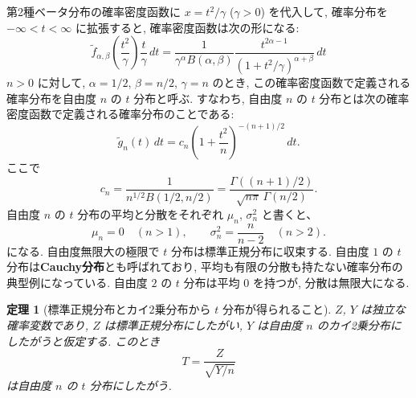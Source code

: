 \documentclass[12pt,twoside]{jarticle}
\newcommand\tf{{\tilde f}}
\newcommand\tg{{\tilde g}}
\theoremstyle{jplain}
\newtheorem{theorem}{定理}
\theoremstyle{jplain}
\theoremstyle{jplain}
\numberwithin{theorem}{section}
\numberwithin{equation}{section}
\numberwithin{figure}{section}
\numberwithin{table}{section}
\begin{document}
第2種ベータ分布の確率密度函数に $x=t^2/\gamma$ ($\gamma>0$) を代入して,
確率分布を $-\infty<t<\infty$ に拡張すると, 確率密度函数は次の形になる:
\[
\tf_{\alpha,\beta}\left(\frac{t^2}{\gamma}\right)\frac{t}{\gamma}\,dt
=\frac{1}{\gamma^\alpha B(\alpha,\beta)}\frac{t^{2\alpha-1}}{(1+t^2/\gamma)^{\alpha+\beta}}\,dt
\]
$n>0$ に対して,
$\alpha=1/2$, $\beta=n/2$, $\gamma=n$ のとき, この確率密度函数で定義される
確率分布を自由度 $n$ の $t$ 分布と呼ぶ.
すなわち, 自由度 $n$ の $t$ 分布とは次の確率密度函数で定義される確率分布のことである:
\[
\tg_n(t)\,dt = c_n\left( 1+\frac{t^2}{n} \right)^{-(n+1)/2}\,dt.
\]
ここで
\[
c_n
=\frac{1}{n^{1/2}B(1/2,n/2)}
=\frac{\Gamma((n+1)/2)}{\sqrt{n\pi}\,\Gamma(n/2)}.
\]
自由度 $n$ の $t$ 分布の平均と分散をそれぞれ $\mu_n$, $\sigma_n^2$ と書くと、
\[
\mu_n = 0 \quad (n>1), \qquad
\sigma_n^2 = \frac{n}{n-2} \quad (n>2).
\]
になる.  自由度無限大の極限で $t$ 分布は標準正規分布に収束する.
自由度 $1$ の $t$ 分布は{\bfseries Cauchy分布}とも呼ばれており,
平均も有限の分散も持たない確率分布の典型例になっている.
自由度 $2$ の $t$ 分布は平均 $0$ を持つが, 分散は無限大になる.

\begin{theorem}[標準正規分布とカイ2乗分布から $t$ 分布が得られること]
\label{theorem:t}
$Z$, $Y$ は独立な確率変数であり,
$Z$ は標準正規分布にしたがい,
$Y$ は自由度 $n$ のカイ2乗分布にしたがうと仮定する.
このとき
\[
T = \frac{Z}{\sqrt{Y/n}}
\]
は自由度 $n$ の $t$ 分布にしたがう.
\end{theorem}
\end{document}
